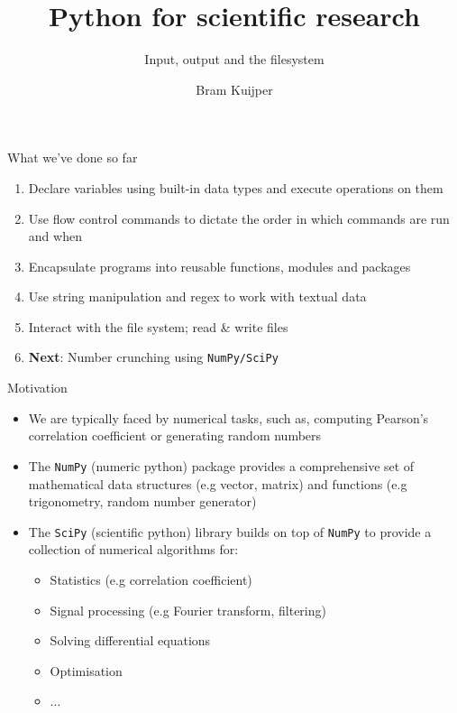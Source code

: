 \documentclass[xcolor=table]{beamer}
\title[Python for scientific research]{Python for scientific research}
\subtitle{Input, output and the filesystem}
\author{Bram Kuijper}
\institute[]{University of Exeter, Penryn Campus, UK}
\begin{document}
\begin{frame}
\titlepage
\end{frame}

\begin{frame}{What we've done so far}

	\begin{enumerate}\addtolength{\itemsep}{.5\baselineskip}
		\item Declare variables using built-in data types and execute operations
		on them
		\item Use flow control commands to dictate the order in which commands are run
		and when
		\item Encapsulate programs into reusable functions, modules and packages
		\item Use string manipulation and regex to work with textual data
        \item Interact with the file system; read \& write files
		\item \textbf{Next}: Number crunching using \texttt{NumPy/SciPy}
	\end{enumerate}

\end{frame}

\begin{frame}{Motivation}

\begin{itemize}\addtolength{\itemsep}{\baselineskip}
	\item<1-> We are typically faced by numerical tasks, 
	such as, computing Pearson's correlation coefficient
	or generating random numbers

	\item<2-> The \texttt{NumPy} (numeric python) package provides
	a comprehensive set of mathematical data structures (e.g vector, matrix)
	and functions (e.g trigonometry, random number generator) 

	\item<3-> The \texttt{SciPy} (scientific python) library builds on top
	of \texttt{NumPy} to provide a collection of numerical algorithms for: 
	\begin{itemize}
		\item<4-> Statistics (e.g correlation coefficient)
		\item<5-> Signal processing (e.g Fourier transform, filtering)
		\item<6-> Solving differential equations
		\item<7-> Optimisation
		\item<8-> $\ldots$
	\end{itemize}
\end{itemize}
\end{frame}
\end{document}
